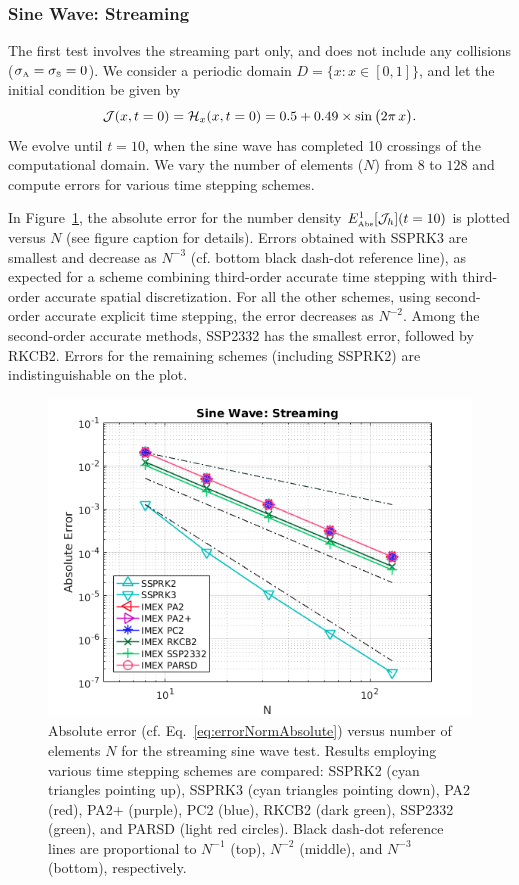 \subsubsection{Sine Wave: Streaming}

The first test involves the streaming part only, and does not include any collisions ($\sigma_{\mbox{\tiny A}}=\sigma_{\mbox{\tiny S}}=0$).  
We consider a periodic domain $D=\{x:x\in[0,1]\}$, and let the initial condition be given by
\begin{equation}
  \mathcal{J}(x,t=0)=\mathcal{H}_{x}(x,t=0)=0.5+0.49\times\sin\big(2\pi\,x\big).  
  \label{eq:initialConditionStreaming}
\end{equation}
We evolve until $t=10$, when the sine wave has completed 10 crossings of the computational domain.  
We vary the number of elements ($N$) from $8$ to $128$ and compute errors for various time stepping schemes.  

In Figure~\ref{fig:SineWaveStreaming}, the absolute error for the number density $E_{\mbox{\tiny Abs}}^{1}[\mathcal{J}_{h}](t=10)$ is plotted versus $N$ (see figure caption for details).  
Errors obtained with SSPRK3 are smallest and decrease as $N^{-3}$ (cf. bottom black dash-dot reference line), as expected for a scheme combining third-order accurate time stepping with third-order accurate spatial discretization.  
For all the other schemes, using second-order accurate explicit time stepping, the error decreases as $N^{-2}$.  
Among the second-order accurate methods, SSP2332 has the smallest error, followed by RKCB2.  
Errors for the remaining schemes (including SSPRK2) are indistinguishable on the plot.  
\begin{figure}[h]
  \centering
    \includegraphics[width=\textwidth]{figures/SineWaveStreaming}
   \caption{Absolute error (cf. Eq.~\eqref{eq:errorNormAbsolute}) versus number of elements $N$ for the streaming sine wave test.  Results employing various time stepping schemes are compared: SSPRK2 (cyan triangles pointing up), SSPRK3 (cyan triangles pointing down), PA2 (red), PA2+ (purple), PC2 (blue), RKCB2 (dark green), SSP2332 (green), and PARSD (light red circles).  Black dash-dot reference lines are proportional to $N^{-1}$ (top), $N^{-2}$ (middle), and $N^{-3}$ (bottom), respectively.}
  \label{fig:SineWaveStreaming}
\end{figure}


